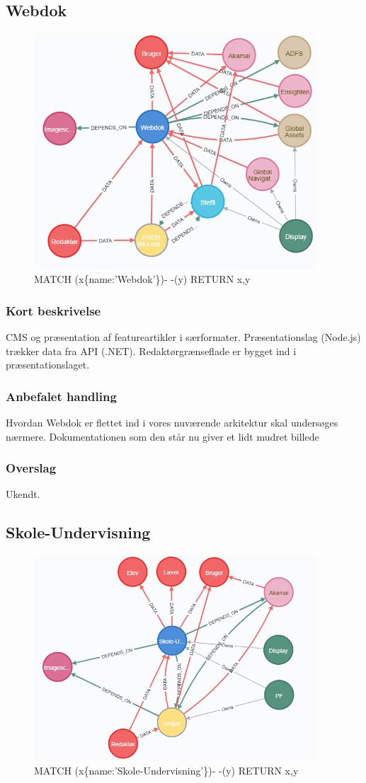 \documentclass{article}
\begin{document}
\subsection{Webdok}
\begin{figure}[h]
\includegraphics[width=300pt]{Webdok.PNG}
\caption{MATCH (x\{name:'Webdok'\})- -(y) RETURN x,y}
\end{figure}
\subsubsection{Kort beskrivelse}
CMS og præsentation af featureartikler i særformater.	
Præsentationslag (Node.js) trækker data fra API (.NET). Redaktørgrænseflade er bygget ind i præsentationslaget.
\subsubsection{Anbefalet handling}
Hvordan Webdok er flettet ind i vores nuværende arkitektur skal undersøges nærmere. Dokumentationen som den står nu giver et lidt mudret billede
\subsubsection{Overslag}
Ukendt.
\newpage{}
\clearpage


\subsection{Skole-Undervisning}
\begin{figure}[h]
\includegraphics[width=300pt]{Skole-Undervisning.PNG}
\caption{MATCH (x\{name:'Skole-Undervisning'\})- -(y) RETURN x,y}
\end{figure}
\end{document}

